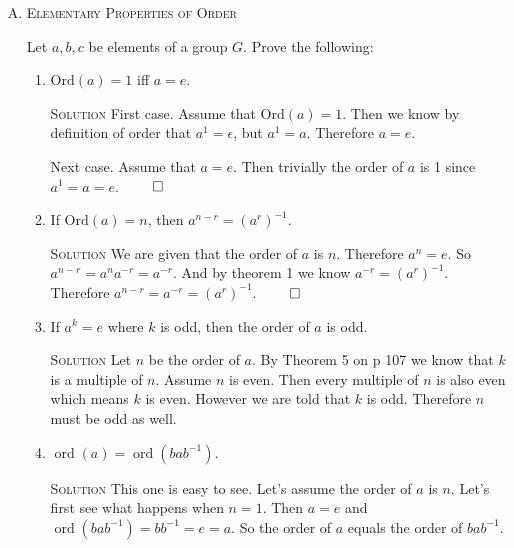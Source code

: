\documentclass[twoside]{amsart}
\newcommand{\Integers}{\ensuremath{\mathbb{Z}{}}\xspace}
\newcommand{\solution}{\textsc{Solution}\xspace}
\newcommand{\blank}{\vspace{5pt}}
\newcommand{\itm}{\blank\item}
\newcommand{\sol}{\blank\noindent\solution}
\newcommand{\ord}{\mathop{\mathrm{ord}}}
\begin{document}
\begin{enumerate}[A.]
\begin{enumerate}[1]
      Fortunately $A$ does not include $0, 1, 2$ as each of those 
      is not defined for one of the powers of $f$. We can
      see that the order of $f$ is 4.

      \itm Can as element of an \emph{infinite} group have 
      \emph{finite} order? Explain.

      \sol Obviously yes it can. The identity element of an infinite
      group is the trivial example. But the previous problem is also
      an example. $S_A$ in the previous problem is an infinte
      set, yet $f$ has finite order.

      \itm In $\Integers_{24}$, list all the elements $(a)$ of order 2;
      $(b)$ of order 3; $(c)$ of order 4; $(d)$ of order 6.

      \sol $(a)$: 12; $(b)$ 8, 16; $(c)$ 6, 18; $(d)$ 4, 20
   \end{enumerate}

   \itm \textsc{Elementary Properties of Order}
   
   \noindent Let $a, b, c$ be elements of a group $G$. Prove the following:

   \begin{enumerate}[1]
      \itm $\mathrm{Ord}(a) = 1$ iff $a=e$.

      \sol First case. Assume that $\mathrm{Ord}(a) = 1$. Then we know by
      definition of order that $a^1 = \epsilon$, but $a^1=a$. Therefore $a=e$.

      Next case. Assume that $a=e$. Then trivially the order of $a$
      is 1 since $a^1=a=e$. $\qed$

      \itm If $\mathrm{Ord}(a)=n$, then $a^{n-r} = (a^r)^{-1}$.

      \sol We are given that the order of $a$ is $n$. Therefore
      $a^n = e$. So $a^{n-r} = a^n a^{-r} = a^{-r}$. And by theorem
      1 we know $a^{-r}=(a^r)^{-1}$. Therefore $a^{n-r} = a^{-r} =
      (a^r)^{-1}$. $\qed$

      \itm If $a^k=e$ where $k$ is odd, then the order of $a$ is odd.
      
      \sol Let $n$ be the order of $a$. By Theorem 5 on p 107 we know that
      $k$ is a multiple of $n$. Assume $n$ is even. Then every multiple of
      $n$ is also even which means $k$ is even. However we are told that
      $k$ is odd. Therefore $n$ must be odd as well.

      \itm $\ord(a) = \ord(bab^{-1})$.

      \sol This one is easy to see. Let's assume the order of $a$
      is $n$. Let's first see what happens when $n=1$. Then
      $a=e$ and $\ord(bab^{-1}) = bb^{-1} = e = a$. So the order of
      $a$ equals the order of $bab^{-1}$.


\end{enumerate}
\end{enumerate}
\end{document}
